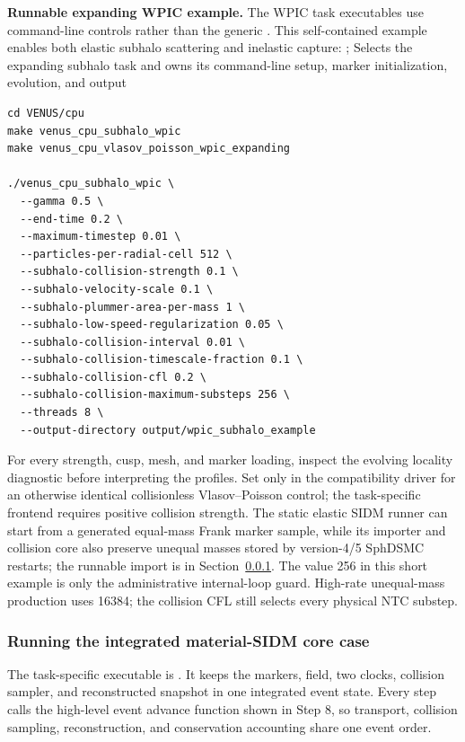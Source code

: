 \noindent\textbf{Runnable expanding WPIC example.}
The WPIC task executables use command-line controls rather than the generic
.  This self-contained example enables both elastic subhalo
scattering and inelastic capture:
{;
 }
{Selects the expanding subhalo task and owns its command-line setup,
 marker initialization, evolution, and output}
\begin{lstlisting}[basicstyle=\ttfamily\scriptsize]
cd VENUS/cpu
make venus_cpu_subhalo_wpic
make venus_cpu_vlasov_poisson_wpic_expanding

./venus_cpu_subhalo_wpic \
  --gamma 0.5 \
  --end-time 0.2 \
  --maximum-timestep 0.01 \
  --particles-per-radial-cell 512 \
  --subhalo-collision-strength 0.1 \
  --subhalo-velocity-scale 0.1 \
  --subhalo-plummer-area-per-mass 1 \
  --subhalo-low-speed-regularization 0.05 \
  --subhalo-collision-interval 0.01 \
  --subhalo-collision-timescale-fraction 0.1 \
  --subhalo-collision-cfl 0.2 \
  --subhalo-collision-maximum-substeps 256 \
  --threads 8 \
  --output-directory output/wpic_subhalo_example
\end{lstlisting}
For every strength, cusp, mesh, and marker loading, inspect the evolving
locality diagnostic before interpreting the profiles.  Set
 only in the compatibility driver for an
otherwise identical collisionless Vlasov--Poisson control; the task-specific
\code{venus_cpu_subhalo_wpic} frontend requires positive collision strength.
The static elastic SIDM runner can start from a generated equal-mass Frank
marker sample, while its importer and collision core also preserve unequal
masses stored by version-4/5 SphDSMC restarts; the runnable import is in
Section~\ref{sec:wpic-material-sidm-run}.  The value 256 in this short example
is only the administrative internal-loop guard.  High-rate unequal-mass
production uses 16384; the collision CFL still selects every physical NTC
substep.

\subsubsection{Running the integrated material-SIDM core case}
\label{sec:wpic-material-sidm-run}

The task-specific executable is
\code{venus_cpu_sidm_wpic_constant}.  It keeps the
markers, field, two clocks, collision sampler, and reconstructed snapshot in
one integrated event state.  Every step calls the high-level event advance
function shown in Step 8, so transport, collision sampling, reconstruction,
and conservation accounting share one event order.

